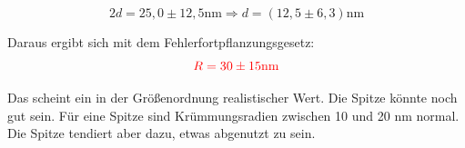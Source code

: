 \begin{equation*}
    2d = 25,0\pm12,5\mathrm{nm} \Rightarrow d = (12,5\pm 6,3) \mathrm{nm} 
\end{equation*}

Daraus ergibt sich mit dem Fehlerfortpflanzungsgesetz:\\

\begin{equation}
    \textcolor{red}{R = 30\pm15 \mathrm{nm}}
\end{equation}

Das scheint ein in der Größenordnung realistischer Wert. Die Spitze könnte noch gut sein. Für eine Spitze sind Krümmungsradien zwischen 
10 und 20 nm normal. Die Spitze tendiert aber dazu, etwas abgenutzt zu sein.